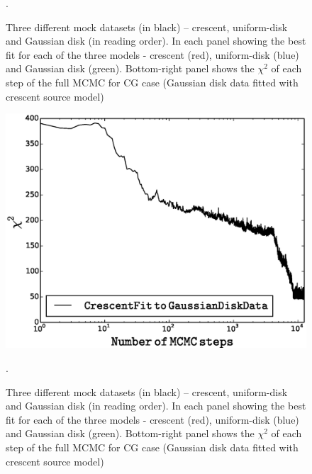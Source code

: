 \begin{figure}
\caption{\label{fig:datafitting} Three different mock datasets (in black) -- crescent, uniform-disk and Gaussian disk (in reading order). In each panel showing the best fit for each of the three models - crescent (red), uniform-disk (blue) and Gaussian disk (green). Bottom-right panel shows the $\chi^2$ of each step of the full MCMC for CG case (Gaussian disk data fitted with crescent source model)}. 
\end{figure}


\begin{figure}
\centering
\includegraphics[width=0.9\hsize]{plots/burnin_cg.eps}
\caption{\label{fig:datafitting} Three different mock datasets (in black) -- crescent, uniform-disk and Gaussian disk (in reading order). In each panel showing the best fit for each of the three models - crescent (red), uniform-disk (blue) and Gaussian disk (green). Bottom-right panel shows the $\chi^2$ of each step of the full MCMC for CG case (Gaussian disk data fitted with crescent source model)}. 
\end{figure}




